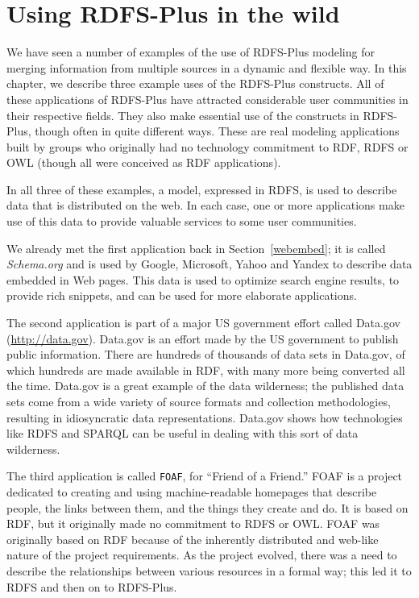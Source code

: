 \chapter{Using RDFS-Plus in the wild}
\label{ch10}

We have seen a number of examples of the use of RDFS-Plus modeling for
merging information from multiple sources in a dynamic and flexible way.
In this chapter, we describe three  example uses of the RDFS-Plus
constructs. All of these applications of RDFS-Plus have attracted
considerable user communities in their respective fields. They
also make essential use of the constructs in RDFS-Plus, though often in
quite different ways. These are real modeling applications built by
groups who originally had no technology commitment to RDF, RDFS or OWL
(though all were conceived as RDF applications).

In all three of these examples, a model, expressed in RDFS, is used to describe
data that is distributed on the web.  In each case, one or more applications
make use of this data to provide valuable services to some user communities.  




We already met the first application back in Section~\ref{webembed}; it is 
called \emph{Schema.org} and is used by Google, Microsoft, Yahoo and Yandex 
to describe data embedded in Web pages.  This data is used to optimize search
engine results, to provide rich snippets, and can be used for more elaborate 
applications. 

The second application is part of a major US government effort called
Data.gov (\url{http://data.gov}). Data.gov is an effort made by the US
government to publish public information. There are hundreds of
thousands of data sets in Data.gov, of which hundreds are made available
in RDF, with many more being converted all the time. Data.gov is a great
example of the data wilderness; the published data sets
come from a wide variety of source formats and collection methodologies,
resulting in idiosyncratic data representations. Data.gov shows how
technologies like RDFS and SPARQL can be useful in dealing with this
sort of data wilderness.

The third application is called \texttt{FOAF}, for ``Friend of a Friend.'' FOAF
is a project dedicated to creating and using machine-readable homepages
that describe people, the links between them, and the things they create
and do. It is based on RDF, but it originally made no commitment to RDFS
or OWL.
FOAF was originally based on RDF because of the inherently distributed
and web-like nature of the 
project requirements. As the project evolved, there was a need to
describe the relationships between various resources in a formal way;
this led it to RDFS and then on to RDFS-Plus.




